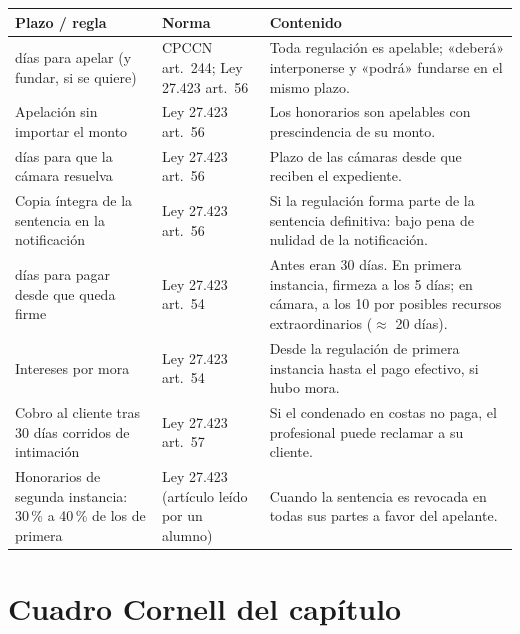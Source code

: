 \documentclass[12pt,oneside]{book}
\begin{document}
\begin{table}[H]
\centering
\begin{tabularx}{\textwidth}{>{\raggedright\arraybackslash}p{}>{\raggedright\arraybackslash}p{}>{\raggedright\arraybackslash}X}
\toprule
\textbf{Plazo / regla} & \textbf{Norma} & \textbf{Contenido} \\
\midrule
5 días para apelar (y fundar, si se quiere) & CPCCN art.~244; Ley 27.423 art.~56 & Toda regulación es apelable; «deberá» interponerse y «podrá» fundarse en el mismo plazo. \\
Apelación sin importar el monto & Ley 27.423 art.~56 & Los honorarios son apelables con prescindencia de su monto. \\
30 días para que la cámara resuelva & Ley 27.423 art.~56 & Plazo de las cámaras desde que reciben el expediente. \\
Copia íntegra de la sentencia en la notificación & Ley 27.423 art.~56 & Si la regulación forma parte de la sentencia definitiva: bajo pena de nulidad de la notificación. \\
10 días para pagar desde que queda firme & Ley 27.423 art.~54 & Antes eran 30 días. En primera instancia, firmeza a los 5 días; en cámara, a los 10 por posibles recursos extraordinarios ($\approx$ 20 días). \\
Intereses por mora & Ley 27.423 art.~54 & Desde la regulación de primera instancia hasta el pago efectivo, si hubo mora. \\
Cobro al cliente tras 30 días corridos de intimación & Ley 27.423 art.~57 & Si el condenado en costas no paga, el profesional puede reclamar a su cliente. \\
Honorarios de segunda instancia: 30\,\% a 40\,\% de los de primera & Ley 27.423 (artículo leído por un alumno) & Cuando la sentencia es revocada en todas sus partes a favor del apelante. \\
\bottomrule
\end{tabularx}
\end{table}

\section{Cuadro Cornell del capítulo}
\end{document}
